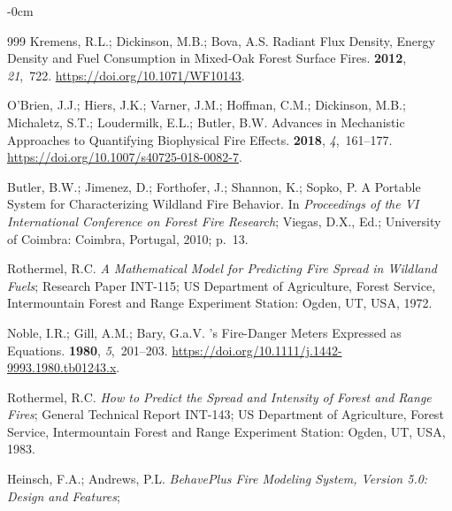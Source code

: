 \documentclass[fire,article,accept,oneauthor,pdftex]{Definitions/mdpi}
\begin{document}
\begin{adjustwidth}{-\extralength}{0cm}
\begin{thebibliography}{999}
Kremens, R.L.; Dickinson, M.B.; Bova, A.S.
\newblock Radiant Flux Density, Energy Density and Fuel Consumption in
  Mixed-Oak Forest Surface Fires.
 {\bf 2012}, {\em
  21},~722.
\newblock
  \url{https://doi.org/10.1071/WF10143}.

O'Brien, J.J.; Hiers, J.K.; Varner, J.M.; Hoffman, C.M.; Dickinson, M.B.;
  Michaletz, S.T.; Loudermilk, E.L.; Butler, B.W.
\newblock Advances in {{Mechanistic Approaches}} to {{Quantifying Biophysical
  Fire Effects}}.
 {\bf 2018}, {\em 4},~161--177.
\newblock
  \url{https://doi.org/10.1007/s40725-018-0082-7}.

Butler, B.W.; Jimenez, D.; Forthofer, J.; Shannon, K.; Sopko, P.
\newblock A Portable System for Characterizing Wildland Fire Behavior.
\newblock  In \emph{Proceedings of the VI International Conference on Forest Fire
  Research}; Viegas, D.X., Ed.; University of Coimbra: Coimbra, Portugal,
  2010; p.~13.

Rothermel, R.C.
\newblock \emph{A Mathematical Model for Predicting Fire Spread in Wildland Fuels};
\newblock Research {{Paper}} INT-115; US Department of Agriculture, Forest
  Service, Intermountain Forest and Range Experiment Station: Ogden, UT, USA, 1972.

Noble, I.R.; Gill, A.M.; Bary, G.a.V.
's Fire-Danger Meters Expressed as Equations.
 {\bf 1980}, {\em 5},~201--203.
\newblock
  \url{https://doi.org/10.1111/j.1442-9993.1980.tb01243.x}.

Rothermel, R.C.
\newblock \emph{How to Predict the Spread and Intensity of Forest and Range Fires};
\newblock General {{Technical Report}} INT-143; US Department of Agriculture,
  Forest Service, Intermountain Forest and Range Experiment Station: Ogden, UT, USA, 
   1983.

Heinsch, F.A.; Andrews, P.L.
\newblock \emph{BehavePlus Fire Modeling System, Version 5.0: Design and
  Features};


\end{thebibliography}
\end{adjustwidth}
\end{document}
